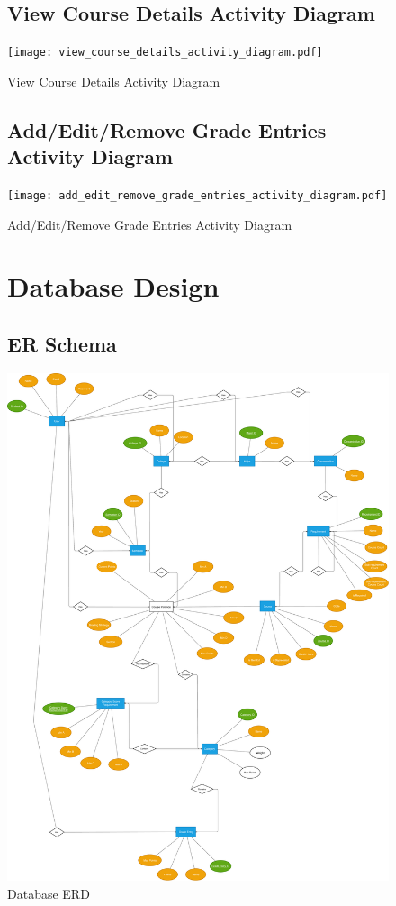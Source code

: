 \documentclass[12pt]{article}
\begin{document}
\begin{figure}[p!]
  \subsection{View Course Details Activity Diagram}
  \centering
  \texttt{[image: view\_course\_details\_activity\_diagram.pdf]}
  \caption{View Course Details Activity Diagram}
\end{figure}

\begin{figure}[p!]
  \subsection{Add/Edit/Remove Grade Entries Activity Diagram}
  \centering
  \texttt{[image: add\_edit\_remove\_grade\_entries\_activity\_diagram.pdf]}
  \caption{Add/Edit/Remove Grade Entries Activity Diagram}
\end{figure}

\begin{figure}[p!]
  \section{Database Design}
  \subsection{ER Schema}
  \centering
  \includegraphics[width=0.90\linewidth]{database_erd.pdf}
  \caption{Database ERD}
\end{figure}
\end{document}
